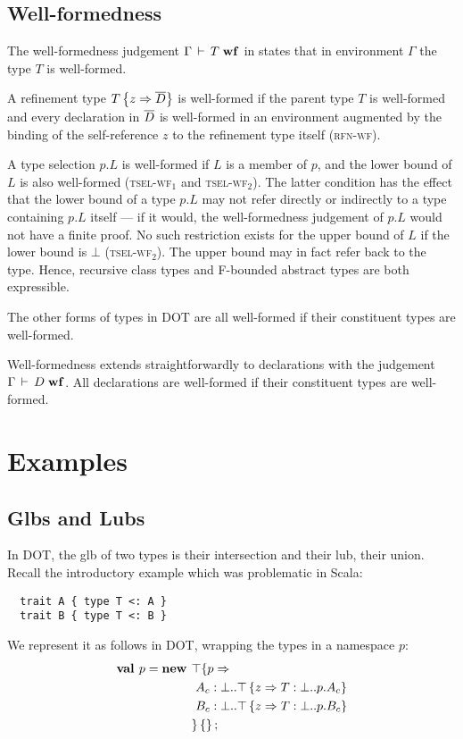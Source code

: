 \documentclass[9pt]{sigplanconf}
\begin{document}
\subsection{Well-formedness}

The well-formedness judgement $\Gamma \,\vdash\, T \;\mbox{\textbf{wf}}$ in 
states that in environment $\Gamma$ the type $T$ is
well-formed.

A refinement type $T \left\{z \Rightarrow \overline{D} \right\}$ is
well-formed if the parent type $T$ is well-formed and every
declaration in $\overline{D}$ is well-formed in an environment augmented by
the binding of the self-reference $z$ to the refinement type itself
(\textsc{rfn-wf}).

A type selection $p.L$ is well-formed if $L$ is a member of $p$, and
the lower bound of $L$ is also well-formed (\textsc{tsel-wf$_1$} and
\textsc{tsel-wf$_2$}). The latter condition has the effect that the
lower bound of a type $p.L$ may not refer directly or indirectly to a
type containing $p.L$ itself --- if it would, the well-formedness
judgement of $p.L$ would not have a finite proof. No such restriction
exists for the upper bound of $L$ if the lower bound is $\bot$
(\textsc{tsel-wf$_2$}). The upper bound may in fact refer back to the
type. Hence, recursive class types and F-bounded abstract types are
both expressible.

The other forms of types in DOT are all well-formed if their
constituent types are well-formed.

Well-formedness extends straightforwardly to declarations with the
judgement $\Gamma \,\vdash\, D \;\mbox{\textbf{wf}}$. All declarations are well-formed if
their constituent types are well-formed.

\section{Examples}\label{dot-examples}

\subsection{Glbs and Lubs}

In DOT, the glb of two types is their intersection and their lub,
their union. Recall the introductory example which was problematic in
Scala:
\begin{lstlisting}
  trait A { type T <: A }
  trait B { type T <: B }
\end{lstlisting}

We represent it as follows in DOT, wrapping the types in a namespace $p$:
\begin{align*}
\textbf{val }p = \textbf{new }&\top \{p \Rightarrow \\
&\ A_c : \bot..\top \left\{z \Rightarrow T : \bot..p.A_c \right\}\\
&\ B_c : \bot..\top \left\{z \Rightarrow T : \bot..p.B_c \right\}\\
& \}\left\{\right\} ;\;\\&
\end{align*}
\end{document}
